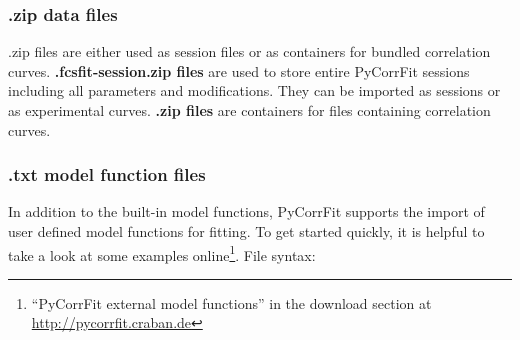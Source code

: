 \subsubsection{.zip data files} 
\mytilde .zip files are either used as session files or as containers for bundled correlation curves. 
\textbf{\mytilde .fcsfit-session.zip files} are used to store entire PyCorrFit sessions including all parameters and modifications. They can be imported as sessions or as experimental curves. 
\textbf{\mytilde .zip files} are containers for files containing correlation curves.

\subsubsection{.txt model function files} 
In addition to the built-in model functions, PyCorrFit supports the import of user defined model functions for fitting. To get started quickly, it is helpful to take a look at some examples online\footnote{``PyCorrFit external model functions'' in the download section at \url{http://pycorrfit.craban.de}}.
File syntax:
